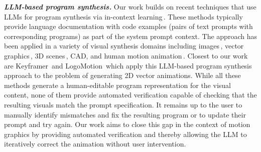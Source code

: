 
\vspace{0.5em}
\noindent
{\bf \em LLM-based program synthesis.} 
Our work builds on recent techniques that use LLMs for 
program synthesis via in-context learning\,\cite{gupta2023visprog,surismenon2023vipergpt}.
%
These methods typically provide language documentation with code examples
(pairs of text prompts with corresponding programs) as part of the
system prompt context.
%
The approach has been applied in a variety of visual synthesis domains
including 
%
images\,\cite{gupta2023visprog}, vector
graphics\,\cite{xing2024llm4svg}, 3D
scenes\,\cite{zhang2024scenelanguage}, CAD, and human
motion animation\,\cite{Goel_2024}.
%
Closest to our work are Keyframer\,\cite{tseng2024keyframer} and
LogoMotion\,\cite{liu2024logomotion} which apply this LLM-based
program synthesis approach to the problem of generating 2D vector
animations.
%
%
While all these methods generate a human-editable program
representation for the visual content, none of them provide automated
verification capable of checking that the resulting visuals match
the prompt specification.
%
It remains up to the user to manually identify mismatches and fix the
resulting program or to update their prompt and try again.
%
Our work aims to close this gap in the context of motion graphics 
by providing automated verification and thereby allowing
the LLM to iteratively correct the animation without user
intervention.


